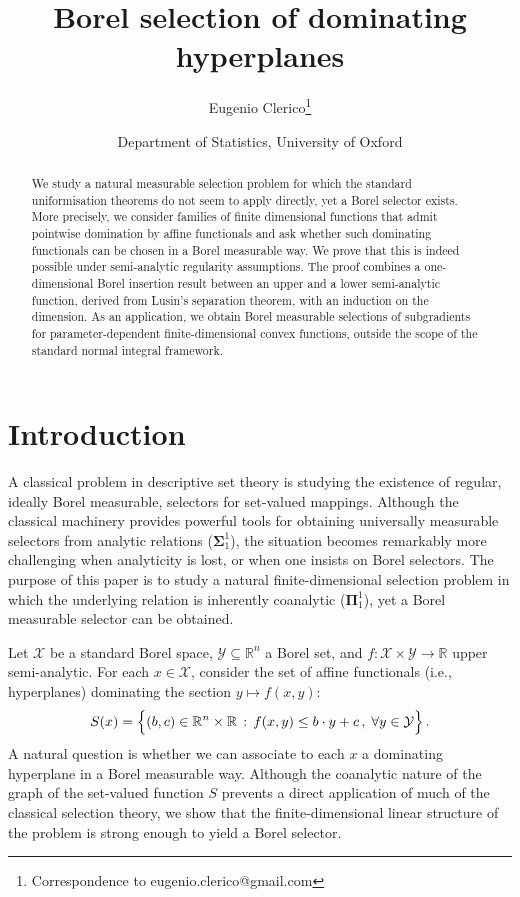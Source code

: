 \documentclass[10pt, a4paper]{article}
\author{Eugenio Clerico\footnote{Correspondence to eugenio.clerico@gmail.com}}
\date{\small Department of Statistics, University of Oxford}
\title{Borel selection of dominating hyperplanes}
\newcommand{\R}{\mathbb R}
\newcommand{\X}{\mathcal X}
\newcommand{\Y}{\mathcal Y}
\begin{document}
\maketitle

\begin{abstract}
\noindent We study a natural measurable selection problem for which the standard uniformisation theorems do not seem to apply directly, yet a Borel selector exists. More precisely, we consider families of finite dimensional functions that admit pointwise domination by affine functionals and ask whether such dominating functionals can be chosen in a Borel measurable way. We prove that this is indeed possible under semi-analytic regularity assumptions. The proof combines a one-dimensional Borel insertion result between an upper and a lower semi-analytic function, derived from Lusin's separation theorem, with an induction on the dimension. As an application, we obtain Borel measurable selections of subgradients for parameter-dependent finite-dimensional convex functions, outside the scope of the standard normal integral framework.
\end{abstract}

\section{Introduction}
A classical problem in descriptive set theory is studying the existence of regular, ideally Borel measurable, selectors for set-valued mappings. Although the classical machinery provides powerful tools for obtaining universally measurable selectors from analytic relations ($\mathbf{\Sigma}^1_1$), the situation becomes remarkably more challenging when analyticity is lost, or when one insists on Borel selectors. The purpose of this paper is to study a natural finite-dimensional  selection problem in which the underlying relation is inherently coanalytic ($\mathbf{\Pi}^1_1$), yet a Borel measurable selector can  be obtained. 

Let $\X$ be a standard Borel space, $\Y\subseteq \mathbb R^n$ a Borel set, and $f:\X\times \Y\to\R$ upper semi-analytic. For each $x\in \X$, consider the set of affine functionals (i.e., hyperplanes) dominating the section $y\mapsto f(x,y)$:
\begin{equation}\label{eq:S(x)}S(x)=\Bigl\{(b,c)\in\R^n\times\R\,:\, f(x,y)\leq b\cdot y+c\,,\; \forall y\in \Y\Bigr\}\,.\end{equation}
A natural question is whether we can associate to each $x$ a dominating hyperplane in a Borel measurable way. Although the coanalytic nature of the graph of the set-valued function $S$ prevents a direct application of much of the classical selection theory, we show that the finite-dimensional linear structure of the problem is strong enough to yield a Borel  selector.
\end{document}
